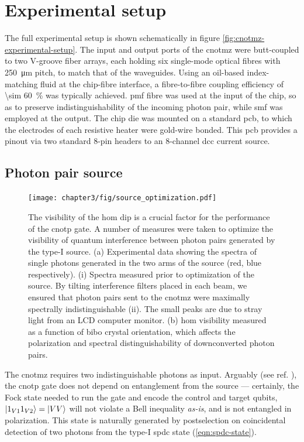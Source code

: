 \section{Experimental setup} 
\label{sec:cnotmz-experimental-setup}
The full experimental setup is shown schematically in figure \ref{fig:cnotmz-experimental-setup}. The input and output ports of the \gls{cnotmz} were butt-coupled to two V-groove fiber arrays, each holding six single-mode optical fibres with \SI{250}{\micro \metre} pitch, to match that of the waveguides. Using an oil-based index-matching fluid at the chip-fibre interface, a fibre-to-fibre coupling efficiency of \SI{\sim 60}{\percent} was typically achieved. \Gls{pmf} fibre was used at the input of the chip, so as to preserve indistinguishability of the incoming photon pair, while \gls{smf} was employed at the output. The chip die was mounted on a standard \gls{pcb}, to which the electrodes of each resistive heater were gold-wire bonded. This \gls{pcb} provides a pinout via two standard 8-pin headers to an 8-channel \acrshort{dcc} current source.

\subsection{Photon pair source} 
\label{sec:cnotmz-source}
\begin{figure}[t]
\centering
\texttt{[image: chapter3/fig/source\_optimization.pdf]}
\caption[Type-I source optimization]{
The visibility of the \gls{hom} dip is a crucial factor for the performance of the \acrshort{cnotp} gate. A number of measures were taken to optimize the visibility of quantum interference between photon pairs generated by the type-I source. (a) Experimental data showing the spectra of single photons generated in the two arms of the source (red, blue respectively). (i) Spectra measured prior to optimization of the source. By tilting interference filters placed in each beam, we ensured that photon pairs sent to the \gls{cnotmz} were maximally spectrally indistinguishable (ii). The small peaks are due to stray light from an LCD computer monitor. (b) \gls{hom} visibility measured as a function of \gls{bibo} crystal orientation, which affects the polarization and spectral distinguishability of downconverted photon pairs.  }
\label{fig:source-optimization}
\end{figure}

The \gls{cnotmz} requires two indistinguishable photons as input. Arguably (see ref. \cite{Tan1991a}), the \gls{cnotp} gate does not depend on entanglement from the source --- certainly, the Fock state needed to run the gate and encode the control and target qubits, $\mbox{$ | 1_{V1} 1_{V2} \rangle $} = \mbox{$ | VV \rangle $}$ will not violate a Bell inequality \emph{as-is}, and is not entangled in polarization. This state is naturally generated by postselection on coincidental detection of two photons from the type-I \gls{spdc} state (\ref{eqn:spdc-state}).

